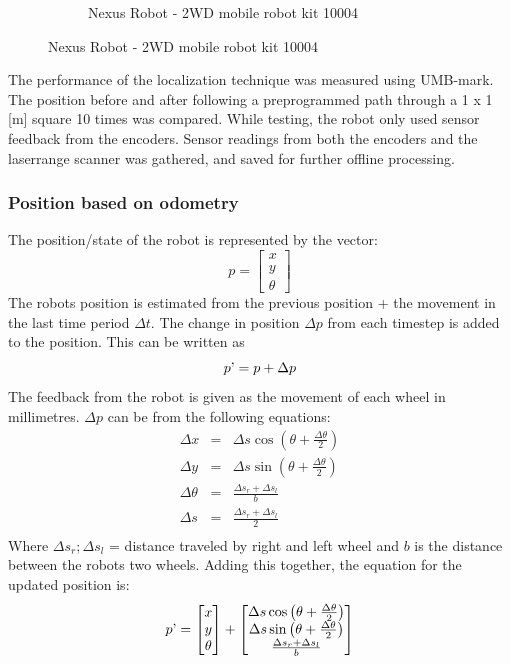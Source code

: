\begin{figure}[ht]
\begin{subfigure}[t]{0.4\textwidth}
    \caption{Nexus Robot - 2WD mobile robot kit 10004}
    \label{laserrange}
  \end{subfigure}
\end{figure}


The performance of the localization technique was measured using UMB-mark. 
The position before and after following a preprogrammed path through a 1 x 1 [m] square 10 times was compared. 
While testing, the robot only used sensor feedback from the encoders. 
Sensor readings from both the encoders and the laserrange scanner was gathered, and saved for further offline processing. 

\subsubsection{Position based on odometry}
The position/state of the robot is represented by the vector: 
\begin{equation}
  p = 
  \begin{bmatrix}
    x \\
    y \\
    \theta 
  \end{bmatrix}
\end{equation}
The robots position is estimated from the previous position + the movement in the last time period $\Delta t$. The change in position $\Delta p$ from each timestep is added to the position. This can be written as 
\begin{equation}
  p\textrm' = p + \Delta p
\end{equation}
The feedback from the robot is given as the movement of each wheel in millimetres. $\Delta p$ can be from the following equations: 
\begin{eqnarray}
	\Delta x &=& \Delta s \cos \left(\theta + \frac{\Delta \theta}{2}\right) \\
	\Delta y &=& \Delta s \sin \left(\theta + \frac{\Delta \theta}{2}\right) \\
	\Delta \theta &=& \frac{\Delta s_r + \Delta s_l}{b} \\
	\Delta s &=& \frac{\Delta s_r + \Delta s_l}{2} \\
\end{eqnarray}
Where $\Delta s_r; \Delta s_l$ = distance traveled by right and left wheel and $b$ is the distance between the robots two wheels. Adding this together, the equation for the updated position is: 
\begin{equation}
  p\textrm' = 
  \begin{bmatrix}
    x \\
    y \\
    \theta 
  \end{bmatrix}
  +
  \begin{bmatrix}
    \Delta s \cos \left(\theta + \frac{\Delta \theta}{2}\right) \\
    \Delta s \sin \left(\theta + \frac{\Delta \theta}{2}\right) \\
    \frac{\Delta s_r + \Delta s_l}{b}
  \end{bmatrix}
\end{equation}
